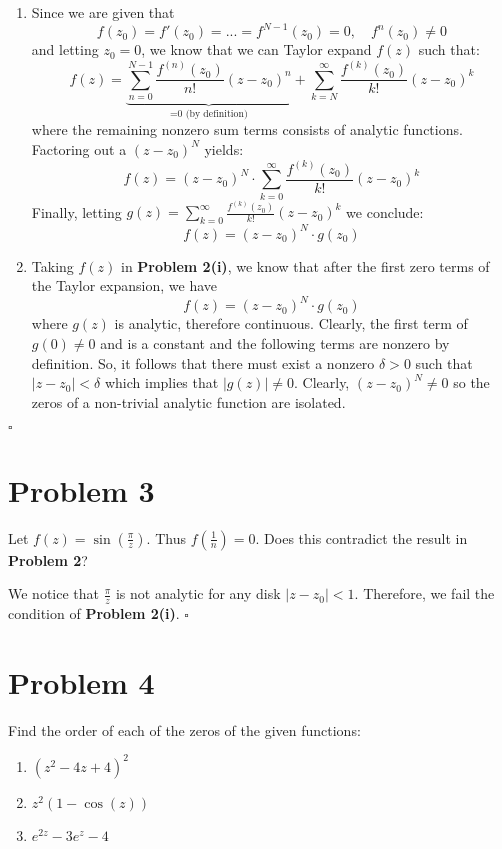 \documentclass[11pt]{article}
\newenvironment{proof}{\noindent{\bf Proof.}}{\hfill $\square$\medskip}
\begin{document}
\begin{proof}
    \begin{enumerate}[label=\textbf{(\roman*)}]
        \item Since we are given that
              $$f(z_{0})=f'(z_{0})=...=f^{N-1}(z_{0})=0,\quad f^{n}(z_{0})\neq0$$
              and letting $z_{0} =0$, we know that we can Taylor expand $f(z)$ such that:
              $$f(z)=\underbrace{\sum_{n=0}^{N-1}\frac{f^{(n)}(z_{0})}{n!}(z-z_{0})^{n}}_\text{=0 (by definition)}+\sum_{k=N}^{\infty}\frac{f^{(k)}(z_{0})}{k!}(z-z_{0})^{k}$$
              where the remaining nonzero sum terms consists of analytic functions. Factoring out a $(z-z_{0})^{N}$ yields:
              $$f(z)=(z-z_{0})^{N}\cdot\sum_{k=0}^{\infty}\frac{f^{(k)}(z_{0})}{k!}(z-z_{0})^{k}$$
              Finally, letting $g(z)=\sum_{k=0}^{\infty}\frac{f^{(k)}(z_{0})}{k!}(z-z_{0})^{k}$ we conclude:
              $$f(z)=(z-z_{0})^{N}\cdot g(z_{0})$$
        \item Taking $f(z)$ in \textbf{Problem 2(i)}, we know that after the first zero terms of the Taylor expansion, we have
              $$f(z)=(z-z_{0})^{N}\cdot g(z_{0})$$
              where $g(z)$ is analytic, therefore continuous.
              Clearly, the first term of $g(0)\neq 0$ and is a constant and the following terms are nonzero by definition. So, it follows that there must exist a nonzero $\delta>0$ such that $\left|z-z_{0}\right|<\delta$ which implies that $\left|g(z)\right|\neq0$. Clearly, $(z-z_{0})^{N}\neq0$ so the zeros of a non-trivial analytic function are isolated.
    \end{enumerate}
\end{proof}


\newpage
\section{Problem 3}
Let $f(z)=\sin(\frac{\pi}{z})$. Thus $f(\frac{1}{n})=0$. Does this contradict the result in \textbf{Problem 2}?

\begin{proof}
    We notice that $\frac{\pi}{z}$ is not analytic for any disk $\left|z-z_{0}\right|<1$. Therefore, we fail the condition of \textbf{Problem 2(i)}. 
\end{proof}


\newpage
\section{Problem 4}
Find the order of each of the zeros of the given functions:
\begin{enumerate}[label=\textbf{(\alph*)}]
    \item $(z^{2}-4z+4)^{2}$
    \item $z^{2}(1-\cos(z))$
    \item $e^{2z}-3e^{z}-4$
\end{enumerate}
\end{document}
